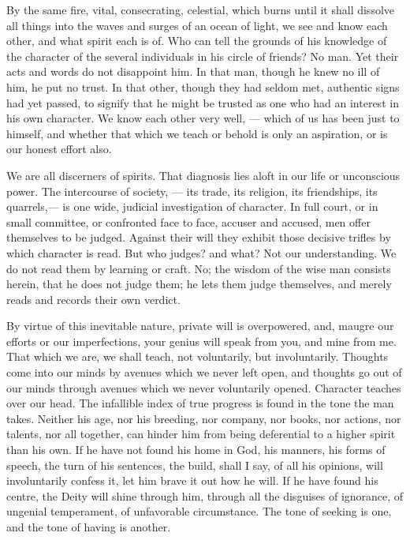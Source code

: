 \documentclass{article}
\begin{document}
By the same fire, vital, consecrating, celestial, which burns until it shall dissolve all things into the waves and surges of an ocean of light, we see and know each other, and what spirit each is of. Who can tell the grounds of his knowledge of the character of the several individuals in his circle of friends? No man. Yet their acts and words do not disappoint him. In that man, though he knew no ill of him, he put no trust. In that other, though they had seldom met, authentic signs had yet passed, to signify that he might be trusted as one who had an interest in his own character. We know each other very well, --- which of us has been just to himself, and whether that which we teach or behold is only an aspiration, or is our honest effort also.

We are all discerners of spirits. That diagnosis lies aloft in our life or unconscious power. The intercourse of society, --- its trade, its religion, its friendships, its quarrels,--- is one wide, judicial investigation of character. In full court, or in small committee, or confronted face to face, accuser and accused, men offer themselves to be judged. Against their will they exhibit those decisive trifles by which character is read. But who judges? and what? Not our understanding. We do not read them by learning or craft. No; the wisdom of the wise man consists herein, that he does not judge them; he lets them judge themselves, and merely reads and records their own verdict.

By virtue of this inevitable nature, private will is overpowered, and, maugre our efforts or our imperfections, your genius will speak from you, and mine from me. That which we are, we shall teach, not voluntarily, but involuntarily. Thoughts come into our minds by avenues which we never left open, and thoughts go out of our minds through avenues which we never voluntarily opened. Character teaches over our head. The infallible index of true progress is found in the tone the man takes. Neither his age, nor his breeding, nor company, nor books, nor actions, nor talents, nor all together, can hinder him from being deferential to a higher spirit than his own. If he have not found his home in God, his manners, his forms of speech, the turn of his sentences, the build, shall I say, of all his opinions, will involuntarily confess it, let him brave it out how he will. If he have found his centre, the Deity will shine through him, through all the disguises of ignorance, of ungenial temperament, of unfavorable circumstance. The tone of seeking is one, and the tone of having is another.
\end{document}
